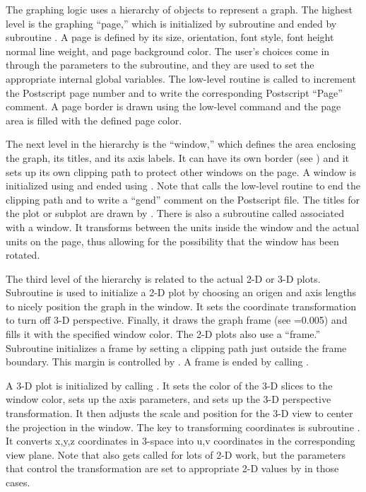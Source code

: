 The graphing logic uses a hierarchy of objects to represent a graph.
The highest level is the graphing ``page,'' which is initialized by
subroutine  and ended by
subroutine .  A page is defined
by its size, orientation, font style, font height normal line weight,
and page background color.  The user's choices come in through
the parameters to the subroutine, and they are used to set the
appropriate internal global variables.  The low-level routine
 is called to increment the
Postscript page number and to write the corresponding Postscript
``Page'' comment.  A page border is drawn using the low-level command
 and the page area is filled
with the defined page color.

The next level in the hierarchy is the ``window,'' which defines the
area enclosing the graph, its titles, and its axis labels.  It can
have its own border (see ) and it sets up its own
clipping path to protect other windows on the page.  A window is
initialized using 
and ended using .  Note
that  calls the low-level routine
 to end the clipping path
and to write a ``gend'' comment on the Postscript file.  The
titles for the plot or subplot are drawn by .
There is also a subroutine called
 associated with a
window.  It transforms between the units inside the window and the
actual units on the page, thus allowing for the possibility that the
window has been rotated.

The third level of the hierarchy is related to the actual 2-D or
3-D plots.  Subroutine 
is used to initialize a 2-D plot by choosing an origen
and axis lengths to nicely position the graph in the window.
It sets the coordinate transformation to turn off
3-D perspective.  Finally, it draws the graph frame (see
=0.005) and fills it with the specified window color.
The 2-D plots also use a ``frame.''  Subroutine
initializes a frame by setting a clipping path just outside the frame
boundary.  This margin is controlled by .  A frame is
ended by calling .

A 3-D plot is initialized by calling
.  It sets the color
of the 3-D slices to the window color, sets up the axis parameters,
and sets up the 3-D perspective transformation.  It then adjusts
the scale and position for the 3-D view to center the projection in
the window.  The key to transforming coordinates is subroutine
.  It converts
x,y,z coordinates in 3-space into u,v coordinates in the
corresponding view plane.  Note that 
also gets called for lots of 2-D work, but the parameters that control
the transformation are set to appropriate 2-D values by 
in those cases.

